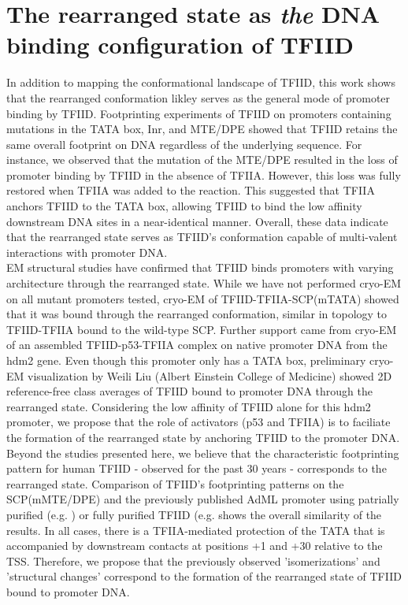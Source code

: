 \section{The rearranged state as \emph{the} DNA binding configuration of TFIID}

In addition to mapping the conformational landscape of TFIID, this work shows that the rearranged conformation likley serves as the general mode of promoter binding by TFIID. Footprinting experiments of TFIID on promoters containing mutations in the TATA box, Inr, and MTE/DPE showed that TFIID retains the same overall footprint on DNA regardless of the underlying sequence. For instance, we observed that the mutation of the MTE/DPE resulted in the loss of promoter binding by TFIID in the absence of TFIIA. However, this loss was fully restored when TFIIA was added to the reaction. This suggested that TFIIA anchors TFIID to the TATA box, allowing TFIID to bind the low affinity downstream DNA sites in a near-identical manner. Overall, these data indicate that the rearranged state serves as TFIID's conformation capable of multi-valent interactions with promoter DNA.\\
\indent EM structural studies have confirmed that TFIID binds promoters with varying architecture through the rearranged state. While we have not performed cryo-EM on all mutant promoters tested, cryo-EM of TFIID-TFIIA-SCP(mTATA) showed that it was bound through the rearranged conformation, similar in topology to TFIID-TFIIA bound to the wild-type SCP. Further support came from cryo-EM of an assembled TFIID-p53-TFIIA complex on native promoter DNA from the hdm2 gene. Even though this promoter only has a TATA box, preliminary cryo-EM visualization by Weili Liu (Albert Einstein College of Medicine) showed 2D reference-free class averages of TFIID bound to promoter DNA through the rearranged state. Considering the low affinity of TFIID alone for this hdm2 promoter, we propose that the role of activators (p53 and TFIIA) is to faciliate the formation of the rearranged state by anchoring TFIID to the promoter DNA. \\    
\indent Beyond the studies presented here, we believe that the characteristic footprinting pattern for human TFIID - observed for the past 30 years - corresponds to the rearranged state. Comparison of TFIID's footprinting patterns on the SCP(mMTE/DPE) and the previously published AdML promoter using patrially purified (e.g. \cite{Sawadogo_3840,Va_3783}) or fully purified TFIID (e.g. \cite{Burke_3081,Chi_3023,Oelgeschlager_2880,Yakovchuk_306} shows the overall similarity of the results. In all cases, there is a TFIIA-mediated protection of the TATA that is accompanied by downstream contacts at positions +1 and +30 relative to the TSS. Therefore, we propose that the previously observed 'isomerizations' and 'structural changes' correspond to the formation of the rearranged state of TFIID bound to promoter DNA. \\
